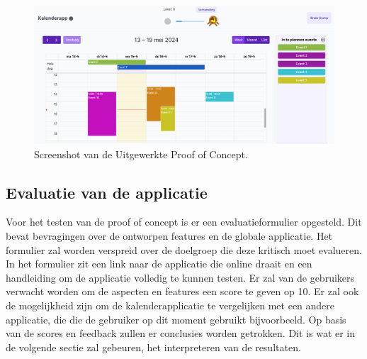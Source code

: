 \begin{figure}[h]
    \centering
    \includegraphics[width=\textwidth]{graphics/screenshot_applicatie.png}
    \caption{Screenshot van de Uitgewerkte Proof of Concept.}
    \label{fig:screenshot_applicatie}
\end{figure}

\subsection{Evaluatie van de applicatie}
Voor het testen van de proof of concept is er een evaluatieformulier opgesteld. Dit bevat bevragingen over de ontworpen features en de globale applicatie. Het formulier zal worden verspreid over de doelgroep die deze kritisch moet evalueren. In het formulier zit een link naar de applicatie die online draait en een handleiding om de applicatie volledig te kunnen testen. Er zal van de gebruikers verwacht worden om de aspecten en features een score te geven op 10. Er zal ook de mogelijkheid zijn om de kalenderapplicatie te vergelijken met een andere applicatie, die die de gebruiker op dit moment gebruikt bijvoorbeeld. Op basis van de scores en feedback zullen er conclusies worden getrokken. Dit is wat er in de volgende sectie zal gebeuren, het interpreteren van de resultaten.


